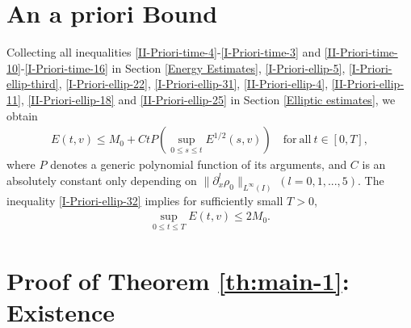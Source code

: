 \documentclass[11pt, reqno]{amsart}
\numberwithin{equation}{section}
\begin{document}
{\section{An a priori Bound}\label{A priori Bound}
Collecting all inequalities \eqref{II-Priori-time-4}-\eqref{I-Priori-time-3} and \eqref{II-Priori-time-10}-\eqref{I-Priori-time-16}  in Section \ref{Energy Estimates}, \eqref{I-Priori-ellip-5}, \eqref{I-Priori-ellip-third}, \eqref{I-Priori-ellip-22}, \eqref{I-Priori-ellip-31}, \eqref{II-Priori-ellip-4}, \eqref{II-Priori-ellip-11}, \eqref{II-Priori-ellip-18} and \eqref{II-Priori-ellip-25} in Section \ref{Elliptic estimates}, we obtain
\begin{equation}\label{I-Priori-ellip-32}
\begin{aligned}
E(t,v)
\leq M_0+CtP(\sup_{0\leq s\leq t}E^{1/2}(s,v))\quad \mathrm{for\ all}\ t\in [0,T],
\end{aligned}
\end{equation}
where \(P\) denotes a generic polynomial function of its arguments, and \(C\) is an absolutely constant only depending on \(\|\partial_x^l\rho_0\|_{L^\infty(I)}\ (l=0,1,...,5)\). The inequality
\eqref{I-Priori-ellip-32} implies for  sufficiently small \(T>0\),
\begin{equation}\label{I-Priori-ellip-33}
	\begin{aligned}
		\sup_{0\leq t\leq T}E(t,v)
		\leq 2M_0.
	\end{aligned}
\end{equation}




\section{Proof of Theorem \ref{th:main-1}: Existence}\label{Existence Part}

}
\end{document}
